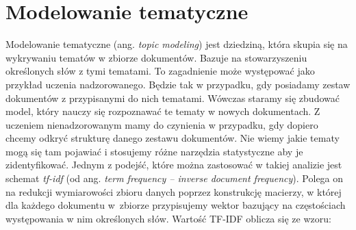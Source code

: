 \documentclass[a4paper,11pt,twoside]{report}
\theoremstyle{definition}
\begin{document}

\chapter{Modelowanie tematyczne}



Modelowanie tematyczne (ang. \textit{topic modeling}) jest dziedziną, która skupia się na wykrywaniu tematów w zbiorze dokumentów. Bazuje na stowarzyszeniu określonych słów z tymi tematami. To zagadnienie może występować jako przykład uczenia nadzorowanego. Będzie tak w przypadku, gdy posiadamy zestaw dokumentów z przypisanymi do nich tematami. Wówczas staramy się zbudować model, który nauczy się rozpoznawać te tematy w nowych dokumentach. Z uczeniem nienadzorowanym mamy do czynienia w przypadku, gdy dopiero chcemy odkryć strukturę danego zestawu dokumentów. Nie wiemy jakie tematy mogą się tam pojawiać i stosujemy różne narzędzia statystyczne aby je zidentyfikować.
Jednym z podejść, które można zastosować w takiej analizie jest schemat \textit{tf-idf} (od ang. \textit{term frequency – inverse document frequency}). Polega on na redukcji wymiarowości zbioru danych poprzez konstrukcję macierzy, w której dla każdego dokumentu w~zbiorze przypisujemy wektor bazujący na częstościach występowania w nim określonych słów. Wartość TF-IDF oblicza się ze wzoru:
\end{document}
